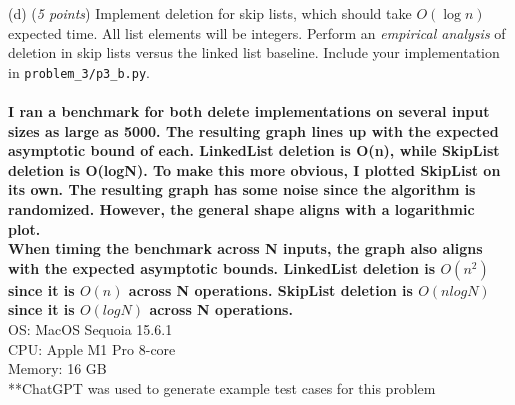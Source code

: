 \documentclass{hw_template}
\begin{document}
\begin{problem}
(d) (\textit{5 points})
Implement deletion for skip lists, which should take $O(\log n)$ expected time. All
list elements will be integers. Perform an \emph{empirical analysis} of deletion in skip lists versus the
linked list baseline. Include your implementation in \texttt{problem\_3/p3\_b.py}.\\\\
\textbf{I ran a benchmark for both delete implementations on several input sizes as large as 5000. The resulting graph lines up with the 
expected asymptotic bound of each. LinkedList deletion is O(n), while SkipList deletion is O(logN). To make this more obvious, I plotted SkipList
on its own. The resulting graph has some noise since the algorithm is randomized. However, the general shape aligns with a logarithmic plot.}\\
\textbf{When timing the benchmark across N inputs, the graph also aligns with the expected asymptotic bounds.
LinkedList deletion is $O(n^2)$ since it is $O(n)$ across N operations.
SkipList deletion is $O(nlogN)$ since it is $O(logN)$ across N operations.}\\

OS: MacOS Sequoia 15.6.1\\
CPU: Apple M1 Pro 8-core\\
Memory: 16 GB\\
**ChatGPT was used to generate example test cases for this problem\\
\\

\end{problem}
\end{document}
